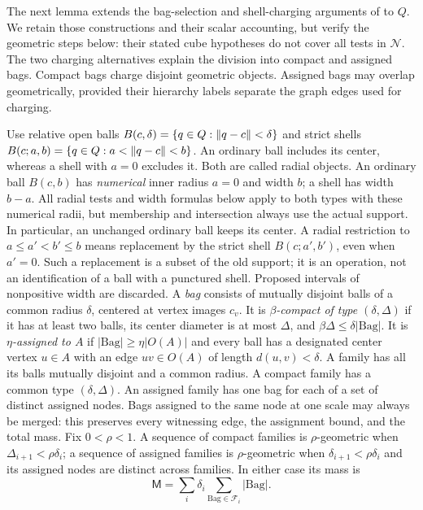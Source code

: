 The next lemma extends the bag-selection and shell-charging arguments of
\cite[Propositions B.7, B.8, and B.10]{ThinTreesCompanion} to $Q$.
We retain those constructions and their scalar accounting, but verify
the geometric steps below: their stated cube hypotheses do not cover
all tests in $\mathcal N$.  The two charging alternatives explain the
division into compact and assigned bags.  Compact bags charge disjoint
geometric objects.  Assigned bags may overlap geometrically, provided
their hierarchy labels separate the graph edges used for charging.

Use relative open balls $B(c,\delta)=\{q\in Q:\lVert q-c\rVert<\delta\}$
and strict shells $B(c;a,b)=\{q\in Q:a<\lVert q-c\rVert<b\}$.
An ordinary ball includes its center, whereas a shell with $a=0$
excludes it.  Both are called radial objects.  An ordinary ball
$B(c,b)$ has \emph{numerical} inner radius $a=0$ and width $b$;
a shell has width $b-a$.  All radial tests and width formulas below
apply to both types with these numerical radii, but membership and
intersection always use the actual support.  In particular, an
unchanged ordinary ball keeps its center.  A radial restriction to
$a\le a'<b'\le b$ means replacement by the strict shell
$B(c;a',b')$, even when $a'=0$.  Such a replacement is a subset
of the old support; it is an operation, not an identification of a
ball with a punctured shell.  Proposed intervals of nonpositive
width are discarded.
A \emph{bag} consists of mutually disjoint balls of
a common radius $\delta$, centered at vertex images $c_v$.
It is \emph{$\beta$-compact of type $(\delta,\Delta)$} if it has
at least two balls, its center diameter is at most $\Delta$, and
$\beta\Delta\le\delta|\mathrm{Bag}|$.
It is \emph{$\eta$-assigned to $A$} if
$|\mathrm{Bag}|\ge\eta|O(A)|$ and every ball has a designated center
vertex $u\in A$ with an edge $uv\in O(A)$ of length $d(u,v)<\delta$.
A family has all its balls mutually disjoint and a common radius.
A compact family has a common type $(\delta,\Delta)$.
An assigned family has one bag for each of a set of distinct assigned
nodes. Bags assigned to the same node at one scale may always be
merged: this preserves every witnessing edge, the assignment bound,
and the total mass.  Fix $0<\rho<1$. A sequence of compact
families is $\rho$-geometric when
$\Delta_{i+1}<\rho\delta_i$; a sequence of assigned families is
$\rho$-geometric when $\delta_{i+1}<\rho\delta_i$ and its assigned
nodes are distinct across families.  In either case its mass is
\[
 \mathsf M=\sum_i\delta_i\sum_{\mathrm{Bag}\in\mathcal F_i}
                                      |\mathrm{Bag}|.
\]

